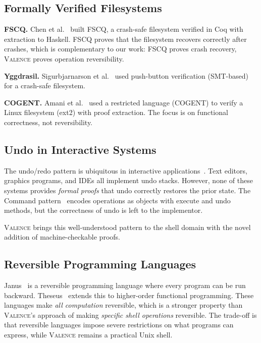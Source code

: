 \documentclass[11pt,a4paper]{article}
\newcommand{\valence}{\textsc{Valence}}
\begin{document}
\subsection{Formally Verified Filesystems}

\textbf{FSCQ.} Chen et al.~\citep{chen2015} built FSCQ, a crash-safe
filesystem verified in Coq with extraction to Haskell. FSCQ proves that the
filesystem recovers correctly after crashes, which is complementary to our
work: FSCQ proves crash recovery, \valence{} proves operation reversibility.

\textbf{Yggdrasil.} Sigurbjarnarson et al.~\citep{sigurbjarnarson2016}
used push-button verification (SMT-based) for a crash-safe filesystem.

\textbf{COGENT.} Amani et al.~\citep{amani2016} used a restricted language
(COGENT) to verify a Linux filesystem (ext2) with proof extraction. The
focus is on functional correctness, not reversibility.

\subsection{Undo in Interactive Systems}

The undo/redo pattern is ubiquitous in interactive
applications~\citep{berlage1994}. Text editors, graphics programs, and IDEs
all implement undo stacks. However, none of these systems provides
\emph{formal proofs} that undo correctly restores the prior state. The
Command pattern~\citep{gamma1994} encodes operations as objects with execute
and undo methods, but the correctness of undo is left to the implementor.

\valence{} brings this well-understood pattern to the shell domain with the
novel addition of machine-checkable proofs.

\subsection{Reversible Programming Languages}

Janus~\citep{yokoyama2007} is a reversible programming language where every
program can be run backward. Theseus~\citep{james2014} extends this to
higher-order functional programming. These languages make \emph{all
computation} reversible, which is a stronger property than \valence{}'s
approach of making \emph{specific shell operations} reversible. The
trade-off is that reversible languages impose severe restrictions on what
programs can express, while \valence{} remains a practical Unix shell.
\end{document}
